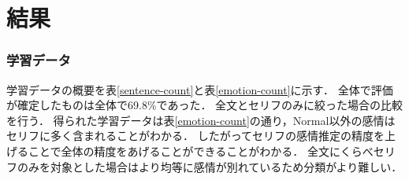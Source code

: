 \chapter{結果}

\subsection{学習データ}
\begin{table}[ht]
 \centering
  \caption{学習データ(物語別)}
  \vspace{0.3\baselineskip}
  \label{sentence-count}
\end{table}

\begin{table}[ht]
 \centering
  \caption{学習データ(感情別)}
  \vspace{0.3\baselineskip}
  \label{emotion-count}
\end{table}

学習データの概要を表\ref{sentence-count}と表\ref{emotion-count}に示す．
全体で評価が確定したものは全体で69.8\%であった．
全文とセリフのみに絞った場合の比較を行う．
得られた学習データは表\ref{emotion-count}の通り，Normal以外の感情はセリフに多く含まれることがわかる．
したがってセリフの感情推定の精度を上げることで全体の精度をあげることができることがわかる．
全文にくらべセリフのみを対象とした場合はより均等に感情が別れているため分類がより難しい．

